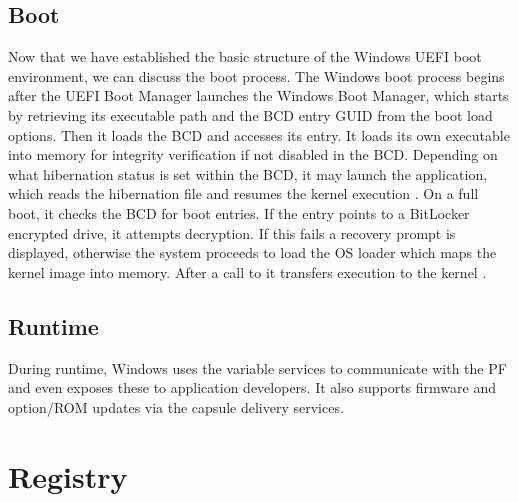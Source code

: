 \subsection{Boot}

Now that we have established the basic structure of the Windows \ac{UEFI} boot environment, we can discuss the boot process.
The Windows boot process begins after the \ac{UEFI} Boot Manager launches the Windows Boot Manager, which starts by retrieving its executable path and the \ac{BCD} entry \ac{GUID} from the boot load options.
Then it loads the \ac{BCD} and accesses its entry.
It loads its own executable into memory for integrity verification \cite[Section 12]{windows-internals-7-part2} if not disabled in the \ac{BCD}.
Depending on what hibernation status is set within the \ac{BCD}, it may launch the  application, which reads the hibernation file and resumes the kernel execution \cite[Section 12]{windows-internals-7-part2}.
On a full boot, it checks the \ac{BCD} for boot entries.
If the entry points to a BitLocker encrypted drive, it attempts decryption.
If this fails a recovery prompt is displayed, otherwise the system proceeds to load the \ac{OS} loader  which maps the kernel image  into memory. After a call to  it transfers execution to the kernel \cite[Section 12]{windows-internals-7-part2}.

\subsection{Runtime}

During runtime, Windows uses the variable services to communicate with the \ac{PF} and even exposes these to application developers.
It also supports firmware and option\-/\ac{ROM} updates via the capsule delivery services.

\section{Registry}

